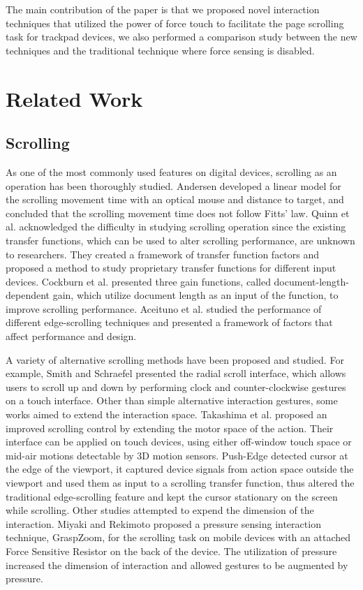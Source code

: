 \documentclass{sigchi}
\begin{document}
The main contribution of the paper is that we proposed novel interaction techniques that utilized the power of force touch to facilitate the page scrolling task for trackpad devices, we also performed a comparison study between the new techniques and the traditional technique where force sensing is disabled.


\section{Related Work}

\subsection{Scrolling}
As one of the most commonly used features on digital devices, scrolling as an operation has been thoroughly studied. Andersen \cite{andersen2005simple} developed a linear model for the scrolling movement time with an optical mouse and distance to target, and concluded that the scrolling movement time does not follow Fitts' law. Quinn et al. \cite{quinn2012exposing} acknowledged the difficulty in studying scrolling operation since the existing transfer functions, which can be used to alter scrolling performance, are unknown to researchers. They created a framework of transfer function factors and proposed a method to study proprietary transfer functions for different input devices. Cockburn et al. \cite{cockburn2012improving} presented three gain functions, called document-length-dependent gain, which utilize document length as an input of the function, to improve scrolling performance. Aceituno et al. \cite{aceituno2017design} studied the performance of different edge-scrolling techniques and presented a framework of factors that affect performance and design.  

A variety of alternative scrolling methods have been proposed and studied. For example, Smith and Schraefel \cite{smith2004radial} presented the radial scroll interface, which allows users to scroll up and down by performing clock and counter-clockwise gestures on a touch interface. Other than simple alternative interaction gestures, some works aimed to extend the interaction space. Takashima et al. \cite{takashima2015exploring} proposed an improved scrolling control by extending the motor space of the action. Their interface can be applied on touch devices, using either off-window touch space or mid-air motions detectable by 3D motion sensors. Push-Edge \cite{malacria2015push} detected cursor at the edge of the viewport, it captured device signals from action space outside the viewport and used them as input to a scrolling transfer function, thus altered the traditional edge-scrolling feature and kept the cursor stationary on the screen while scrolling. Other studies attempted to expend the dimension of the interaction. Miyaki and Rekimoto \cite{miyaki2009graspzoom} proposed a pressure sensing interaction technique, GraspZoom, for the scrolling task on mobile devices with an attached Force Sensitive Resistor on the back of the device. The utilization of pressure increased the dimension of interaction and allowed gestures to be augmented by pressure.  
\end{document}
